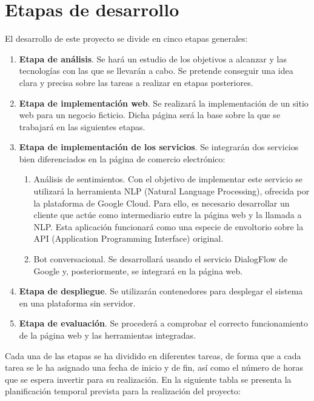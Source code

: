 \chapter{Etapas de desarrollo} 
\label{sec:fases}

El desarrollo de este proyecto se divide en cinco etapas generales:
\begin{enumerate}
    \item \textbf{Etapa de análisis}. Se hará un estudio de los objetivos a alcanzar y las tecnologías con las que se llevarán a cabo. Se pretende conseguir una idea clara y precisa sobre las tareas a realizar en etapas posteriores. 
    \item \textbf{Etapa de implementación web}. Se realizará la implementación de un sitio web para un negocio ficticio. Dicha página será la base sobre la que se trabajará en las siguientes etapas.   
    \item \textbf{Etapa de implementación de los servicios}. Se integrarán dos servicios bien diferenciados en la página de comercio electrónico:
        \begin{enumerate}
            \item Análisis de sentimientos. Con el objetivo de implementar este servicio se utilizará la herramienta NLP (Natural Language Processing), ofrecida por la plataforma de Google Cloud. Para ello, es necesario desarrollar un cliente que actúe como intermediario entre la página web y la llamada a NLP. Esta aplicación funcionará como una especie de envoltorio sobre la API (Application Programming Interface) original.
            \item Bot conversacional. Se desarrollará usando el servicio DialogFlow de Google y, posteriormente, se integrará en la página web.
        \end{enumerate}
    \item \textbf{Etapa de despliegue}. Se utilizarán contenedores para desplegar el sistema en una plataforma sin servidor.
    \item \textbf{Etapa de evaluación}. Se procederá a comprobar el correcto funcionamiento de la página web y las herramientas integradas.
\end{enumerate}

\newpage

Cada una de las etapas se ha dividido en diferentes tareas, de forma que a cada tarea se le ha asignado una fecha de inicio y de fin, así como el número de horas que se espera invertir para su realización. En la siguiente tabla se presenta la planificación temporal prevista para la realización del proyecto:


